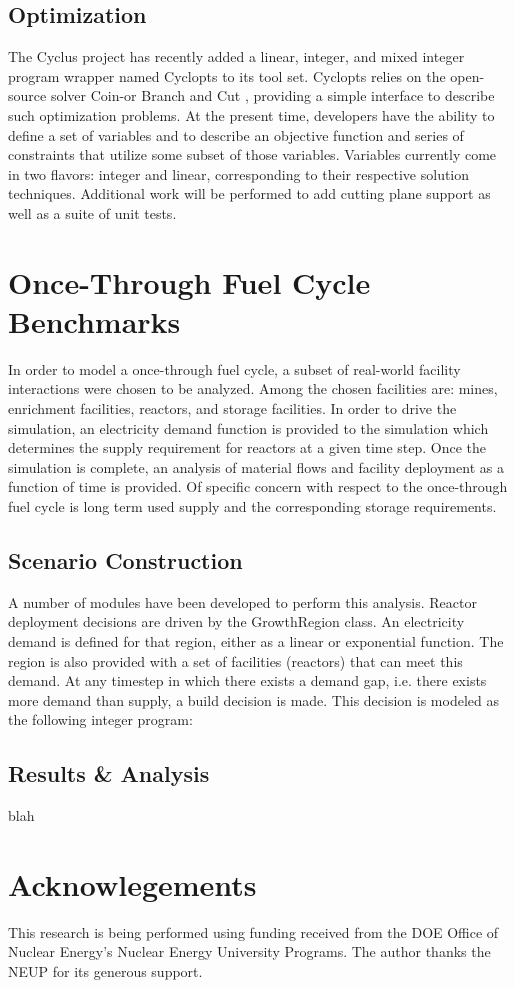 \documentclass{anstrans}
\begin{document}
\subsection{Optimization}
The Cyclus project has recently added a linear, integer, and mixed integer program wrapper named Cyclopts \cite{cyclopts2012} to its tool set. Cyclopts relies on the
open-source solver Coin-or Branch and Cut \cite{coinCBC}, providing a simple interface to describe such optimization problems. At the present time,
developers have the ability to define a set of variables and to describe an objective function and series of constraints that utilize some subset
of those variables. Variables currently come in two flavors: integer and linear, corresponding to their respective solution techniques. Additional
work will be performed to add cutting plane support as well as a suite of unit tests.
\section{Once-Through Fuel Cycle Benchmarks}
In order to model a once-through fuel cycle, a subset of real-world facility interactions were chosen to be analyzed. Among the chosen facilities are:
mines, enrichment facilities, reactors, and storage facilities. In order to drive the simulation, an electricity demand function is provided to the 
simulation which determines the supply requirement for reactors at a given time step. Once the simulation is complete, an analysis of material
flows and facility deployment as a function of time is provided. Of specific concern with respect to the once-through fuel cycle is long term used
supply and the corresponding storage requirements.
\subsection{Scenario Construction}
A number of modules have been developed to perform this analysis. Reactor deployment decisions are driven by the GrowthRegion class. An electricity demand is
defined for that region, either as a linear or exponential function. The region is also provided with a set of facilities (reactors) that can meet
this demand. At any timestep in which there exists a demand gap, i.e. there exists more demand than supply, a build decision is made. This decision is modeled
as the following integer program:
 
\subsection{Results \& Analysis}
blah
\section{Acknowlegements}
This research is being performed using funding received from the DOE Office of Nuclear Energy's Nuclear Energy University Programs. 
The author thanks the NEUP for its generous support.

\end{document}
